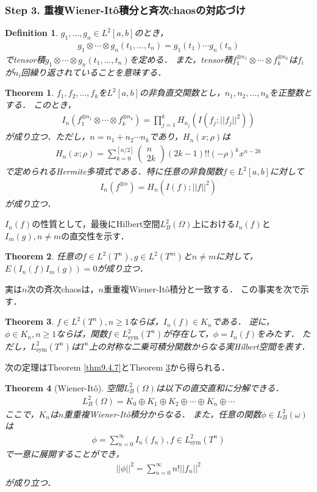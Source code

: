 \documentclass[a4paper,10pt]{jsarticle}
\theoremstyle{plain}
\newtheorem{theorem}{Theorem}
\newtheorem{definition}{Definition}
\newcommand{\eq}[1]{\begin{align}#1\end{align}}
\begin{document}
\subsubsection*{Step 3. 重複Wiener-It\^o積分と斉次chaosの対応づけ}
\begin{definition}
$g_1,...,g_n\in L^2[a,b]$のとき，
\eq{g_1\otimes\cdots\otimes g_n(t_1,...,t_n)=g_1(t_1)\cdots g_n(t_n)}
でtensor積$g_1\otimes\cdots\otimes g_n(t_1,...,t_n)$を定める．
また，tensor積$f_1^{\otimes n_1}\otimes\cdots\otimes f_k^{\otimes n_k}$は$f_i$が$n_i$回繰り返されていることを意味する．
\end{definition}


\begin{theorem}\label{thm9.6.9}
$f_1,f_2,...,f_k$を$L^2[a,b]$の非負直交関数とし，$n_1,n_2,...,n_k$を正整数とする．
このとき，
\eq{I_n\left(f_1^{\otimes n_1}\otimes\cdots\otimes f_k^{\otimes n_k}\right)
	=\prod_{j=1}^kH_{n_j}\left(I(f_j;||f_j||^2)\right)}
が成り立つ．ただし，$n=n_1+n_2\cdots n_k$であり，$H_{n}(x;\rho)$は
\eq{H_n(x;\rho)=\sum_{k=0}^{[n/2]}\left(\begin{matrix}n\\2k\end{matrix}\right)(2k-1)!!(-\rho)^kx^{n-2k}}
で定められるHermite多項式である．特に任意の非負関数$f\in L^2[a,b]$に対して
\eq{I_n(f^{\otimes n})=H_n\left(I(f);||f||^2\right)}
が成り立つ．
\end{theorem}

$I_n(f)$の性質として，最後にHilbert空間$L^2_B(\Omega)$上における$I_n(f)$と$I_m(g),n\neq m$の直交性を示す．
\begin{theorem}\label{thm9.6.10}
任意の$f\in L^2(T^n),g\in L^2(T^m)$と$n\neq m$に対して，$E\left(I_n(f)I_m(g)\right)=0$が成り立つ．
\end{theorem}

実は$n$次の斉次chaosは，$n$重重複Wiener-It\^o積分と一致する．
この事実を次で示す．
\begin{theorem}\label{thm9.7.1}
$f\in L^2(T^n),n\ge1$ならば，$I_n(f)\in K_n$である．
逆に，$\phi\in K_n,n\ge1$ならば，関数$f\in L^2_\mathrm{sym}(T^n)$が存在して，$\phi=I_n(f)$をみたす．
ただし，$L^2_\mathrm{sym}(T^n)$は$T^n$上の対称な二乗可積分関数からなる実Hilbert空間を表す．
\end{theorem}

次の定理はTheorem \ref{thm9.4.7}とTheorem \ref{thm9.7.1}から得られる．
\begin{theorem}[Wiener-It\^o]\label{thm9.7.3}
空間$L^2_B(\Omega)$は以下の直交直和に分解できる．
\eq{L^2_B(\Omega)=K_0\oplus K_1\oplus K_2\oplus\cdots\oplus K_n\oplus\cdots}
ここで，$K_n$は$n$重重複Wiener-It\^o積分からなる．
また，任意の関数$\phi\in L^2_B(\omega)$は
\eq{\phi=\sum_{n=0}^\infty I_n(f_n), f\in L^2_\mathrm{sym}(T^n)}
で一意に展開することができ，
\eq{||\phi||^2=\sum_{n=0}^\infty n!||f_n||^2}
が成り立つ．
\end{theorem}
\end{document}
